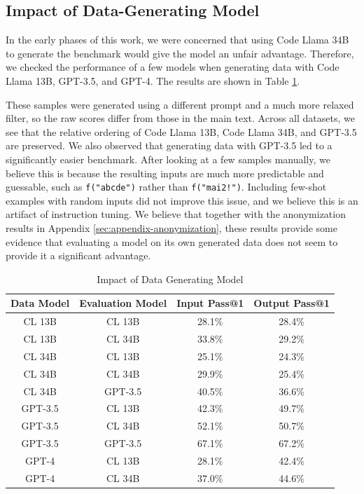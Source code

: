 \subsection{Impact of Data-Generating Model}
In the early phases of this work, we were concerned that using Code Llama 34B to generate the benchmark would give the model an unfair advantage. Therefore, we checked the performance of a few models when generating data with Code Llama 13B, GPT-3.5, and GPT-4. The results are shown in Table \ref{tab:benchmark-results-data-generating}. 

These samples were generated using a different prompt and a much more relaxed filter, so the raw scores differ from those in the main text. Across all datasets, we see that the relative ordering of Code Llama 13B, Code Llama 34B, and GPT-3.5 are preserved. We also observed that generating data with GPT-3.5 led to a significantly easier benchmark. After looking at a few samples manually, we believe this is because the resulting inputs are much more predictable and guessable, such as \texttt{f("abcde")} rather than \texttt{f("mai2!")}. Including few-shot examples with random inputs did not improve this issue, and we believe this is an artifact of instruction tuning. We believe that together with the anonymization results in Appendix \ref{sec:appendix-anonymization}, these results provide some evidence that evaluating a model on its own generated data does not seem to provide it a significant advantage.


\begin{table}[H]
    \centering
    \caption{Impact of Data Generating Model}
    \begin{tabular}{cccc}
        \toprule
        \textbf{Data Model} & \textbf{Evaluation Model} & \textbf{Input Pass@1} & \textbf{Output Pass@1} \\
        \midrule
        CL 13B & CL 13B & 28.1\% & 28.4\% \\
        CL 13B & CL 34B & 33.8\% & 29.2\% \\
        \midrule
        CL 34B & CL 13B & 25.1\% & 24.3\% \\
        CL 34B & CL 34B & 29.9\% & 25.4\% \\
        CL 34B & GPT-3.5 & 40.5\% & 36.6\% \\
        \midrule
        GPT-3.5 & CL 13B & 42.3\% & 49.7\% \\
        GPT-3.5 & CL 34B & 52.1\% & 50.7\% \\
        GPT-3.5 & GPT-3.5 & 67.1\% & 67.2\% \\
        \midrule
        GPT-4 & CL 13B & 28.1\% & 42.4\% \\
        GPT-4 & CL 34B & 37.0\% & 44.6\% \\
        \bottomrule
    \end{tabular}
    \label{tab:benchmark-results-data-generating}
\end{table}

